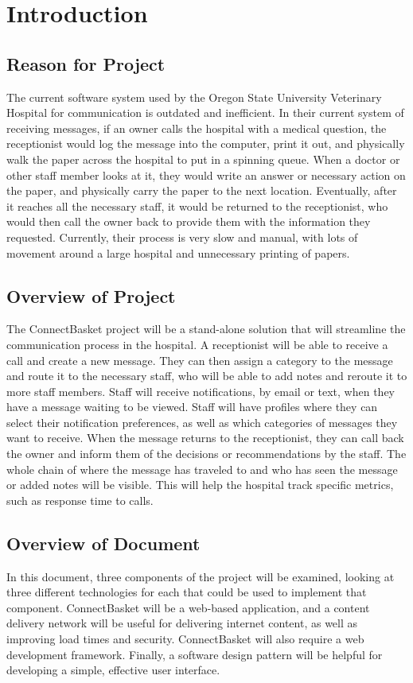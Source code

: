\documentclass[onecolumn, draftclsnofoot,10pt, compsoc]{IEEEtran}
\begin{document}

\section{Introduction}

\subsection{Reason for Project}
The current software system used by the Oregon State University Veterinary Hospital for communication is outdated and inefficient. In their current system of receiving messages, if an owner calls the hospital with a medical question, the receptionist would log the message into the computer, print it out, and physically walk the paper across the hospital to put in a spinning queue. When a doctor or other staff member looks at it, they would write an answer or necessary action on the paper, and physically carry the paper to the next location. Eventually, after it reaches all the necessary staff, it would be returned to the receptionist, who would then call the owner back to provide them with the information they requested. Currently, their process is very slow and manual, with lots of movement around a large hospital and unnecessary printing of papers.

\subsection{Overview of Project}
The ConnectBasket project will be a stand-alone solution that will streamline the communication process in the hospital. A receptionist will be able to receive a call and create a new message. They can then assign a category to the message and route it to the necessary staff, who will be able to add notes and reroute it to more staff members. Staff will receive notifications, by email or text, when they have a message waiting to be viewed. Staff will have profiles where they can select their notification preferences, as well as which categories of messages they want to receive. When the message returns to the receptionist, they can call back the owner and inform them of the decisions or recommendations by the staff. The whole chain of where the message has traveled to and who has seen the message or added notes will be visible. This will help the hospital track specific metrics, such as response time to calls. 

\subsection{Overview of Document}
In this document, three components of the project will be examined, looking at three different technologies for each that could be used to implement that component. ConnectBasket will be a web-based application, and a content delivery network will be useful for delivering internet content, as well as improving load times and security. ConnectBasket will also require a web development framework. Finally, a software design pattern will be helpful for developing a simple, effective user interface. 
\end{document}

